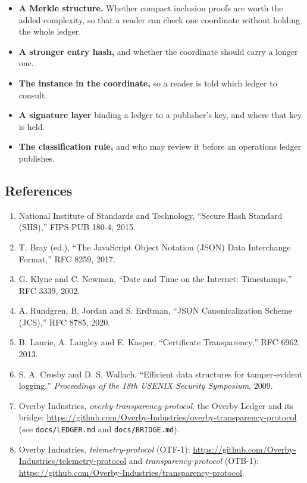 \documentclass[
  12pt,
  letterpaper,
]{article}
\providecommand{\tightlist}{%
  \setlength{\itemsep}{0pt}\setlength{\parskip}{0pt}}
\begin{document}
\begin{itemize}
\tightlist
\item
  \textbf{A Merkle structure.} Whether compact inclusion proofs are
  worth the added complexity, so that a reader can check one coordinate
  without holding the whole ledger.
\item
  \textbf{A stronger entry hash,} and whether the coordinate should
  carry a longer one.
\item
  \textbf{The instance in the coordinate,} so a reader is told which
  ledger to consult.
\item
  \textbf{A signature layer} binding a ledger to a publisher's key, and
  where that key is held.
\item
  \textbf{The classification rule,} and who may review it before an
  operations ledger publishes.
\end{itemize}

\hypertarget{references}{%
\subsection{References}\label{references}}

\begin{enumerate}
\def\labelenumi{\arabic{enumi}.}
\tightlist
\item
  National Institute of Standards and Technology, ``Secure Hash Standard
  (SHS),'' FIPS PUB 180-4, 2015.
\item
  T. Bray (ed.), ``The JavaScript Object Notation (JSON) Data
  Interchange Format,'' RFC 8259, 2017.
\item
  G. Klyne and C. Newman, ``Date and Time on the Internet: Timestamps,''
  RFC 3339, 2002.
\item
  A. Rundgren, B. Jordan and S. Erdtman, ``JSON Canonicalization Scheme
  (JCS),'' RFC 8785, 2020.
\item
  B. Laurie, A. Langley and E. Kasper, ``Certificate Transparency,'' RFC
  6962, 2013.
\item
  S. A. Crosby and D. S. Wallach, ``Efficient data structures for
  tamper-evident logging,'' \emph{Proceedings of the 18th USENIX
  Security Symposium}, 2009.
\item
  Overby Industries, \emph{overby-transparency-protocol}, the Overby
  Ledger and its bridge:
  \url{https://github.com/Overby-Industries/overby-transparency-protocol}
  (see \texttt{docs/LEDGER.md} and \texttt{docs/BRIDGE.md}).
\item
  Overby Industries, \emph{telemetry-protocol} (OTF-1):
  \url{https://github.com/Overby-Industries/telemetry-protocol} and
  \emph{transparency-protocol} (OTB-1):
  \url{https://github.com/Overby-Industries/transparency-protocol}.
\end{enumerate}
\end{document}
